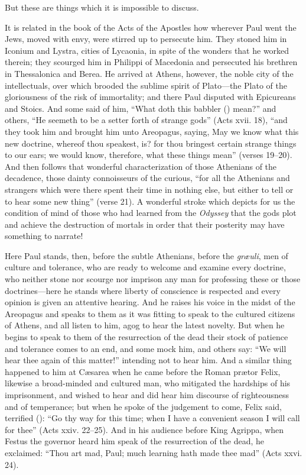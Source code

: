 But these are things which it is impossible to discuss.

It is related in the book of the Acts of the Apostles how wherever
Paul went the Jews, moved with envy, were stirred up to persecute him.
They stoned him in Iconium and Lystra, cities of Lycaonia, in spite of
the wonders that he worked therein; they scourged him in Philippi of
Macedonia and persecuted his brethren in Thessalonica and Berea. He
arrived at Athens, however, the noble city of the intellectuals, over
which brooded the sublime spirit of Pla\-to---the Plato of the
gloriousness of the risk of immortality; and there Paul disputed with
Epicureans and Stoics. And some said of him, ``What doth this babbler
() mean?'' and others, ``He seemeth to be a setter
forth of strange gods'' (Acts xvii. 18), ``and they took him and
brought him unto Areopagus, saying, May we know what this new
doctrine, whereof thou speakest, is? for thou bringest certain strange
things to our ears; we would know, therefore, what these things mean''
(verses 19--20). And then follows that wonderful characterization of
those Athenians of the decadence, those dainty connoisseurs of the
curious, ``for all the Athenians and strangers which were there spent
their time in nothing else, but either to tell or to hear some new
thing'' (verse 21). A wonderful stroke which depicts for us the
condition of mind of those who had learned from the \textit{Odyssey}
that the gods plot and  achieve the destruction of mortals in
order that their posterity may have something to narrate!

Here Paul stands, then, before the subtle Athenians, before the
\textit{gr\ae uli}, men of culture and tolerance, who are ready to
welcome and examine every doctrine, who neither stone nor scourge nor
imprison any man for professing these or those doc\-trines---here he
stands where liberty of conscience is respected and every opinion is
given an attentive hearing. And he raises his voice in the midst of
the Areopagus and speaks to them as it was fitting to speak to the
cultured citizens of Athens, and all listen to him, agog to hear the
latest novelty. But when he begins to speak to them of the
resurrection of the dead their stock of patience and tolerance comes
to an end, and some mock him, and others say: ``We will hear thee
again of this matter!'' intending not to hear him. And a similar thing
happened to him at C\ae sarea when he came before the Roman pr\ae tor
Felix, likewise a broad-minded and cultured man, who mitigated the
hardships of his imprisonment, and wished to hear and did hear him
discourse of righteousness and of temperance; but when he spoke of the
judgement to come, Felix said, terrified ():
``Go thy way for this time; when I have a convenient season I will
call for thee'' (Acts xxiv. 22--25). And in his audience before King
Agrippa, when Festus the governor heard him speak of the resurrection
of the dead, he exclaimed: ``Thou art mad, Paul; much learning hath
made thee mad'' (Acts xxvi. 24).

